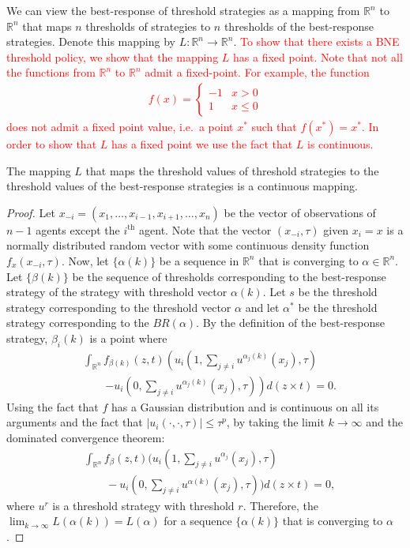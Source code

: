 \documentclass[smallextended]{svjour3}       %
\newcommand{\edit}[1]{\textcolor{red}{#1}}
\def\R{\mathbb{R}}    %
\begin{document}
We can view the best-response of threshold strategies as a mapping from $\R^n$ to $\R^n$ that maps $n$ thresholds of strategies to $n$ thresholds of the best-response strategies. Denote this mapping by $L:\R^n\to\R^n$. \edit{To show that there exists a BNE threshold policy, we show that the mapping $L$ has a fixed point. Note that not all the functions from $\R^n$ to $\R^n$ admit a fixed-point. For example, the function 
	\begin{align*}
		f(x)=\left\{\begin{array}{ll}
			-1&x>0\\
			1&x\leq 0
			\end{array}\right.
	\end{align*}
	does not admit a fixed point value, i.e.\ a point $x^*$ such that $f(x^*)=x^*$. In order to show that $L$ has a fixed point we use the fact that $L$ is continuous. }
\begin{lemma}\label{lemma:continuous}
The mapping $L$ that maps the threshold values of threshold strategies to the threshold values of the best-response strategies is a continuous mapping. 
\end{lemma}


\begin{proof}
Let $x_{-i}=(x_1,\ldots,x_{i-1},x_{i+1},\ldots,x_n)$ be the vector of observations of $n-1$ agents except the $i^{\text{th}}$ agent. Note that the vector $(x_{-i},\tau)$ given $x_i=x$ is a normally distributed random vector with some continuous density function $f_{x}(x_{-i},\tau)$. Now, let $\{\alpha(k)\}$ be a sequence in $\R^n$ that is converging to $\alpha\in\R^n$. Let $\{\beta(k)\}$ be the sequence of thresholds corresponding to the best-response strategy of the strategy with threshold vector $\alpha(k)$. Let $s$ be the threshold strategy corresponding to the threshold vector $\alpha$ and let $\alpha^*$ be the threshold strategy corresponding to the $BR(\alpha)$. By the definition of the best-response strategy, $\beta_i(k)$ is a point where 
\begin{align*}
&\int_{\R^{n}}f_{\beta(k)}(z,t)\left(u_i(1,\sum_{j\not=i}u^{\alpha_j(k)}(x_j),\tau)\right.\\
&\qquad\left.-u_i(0,\sum_{j\not=i}u^{\alpha_j(k)}(x_j),\tau)\right)d(z\times t)=0.
\end{align*}
Using the fact that $f$ has a Gaussian distribution and is continuous on all its arguments and the fact that $|u_i(\cdot,\cdot,\tau)|\leq \tau^p$, by taking the limit $k\to\infty$ and the dominated convergence theorem:
\begin{align*}
&\int_{\R^{n}}f_{\beta}(z,t)(u_i(1,\sum_{j\not=i}u^{\alpha_j}(x_j),\tau)\\ 
&\qquad-u_i(0,\sum_{j\not=i}u^{\alpha(k)}(x_j),\tau))d(z\times t)=0,
\end{align*}
where $u^{r}$ is a threshold strategy with threshold $r$. Therefore, the $\lim_{k\to\infty}L(\alpha(k))=L(\alpha)$ for a sequence $\{\alpha(k)\}$ that is converging to $\alpha$.
\end{proof}
\end{document}

